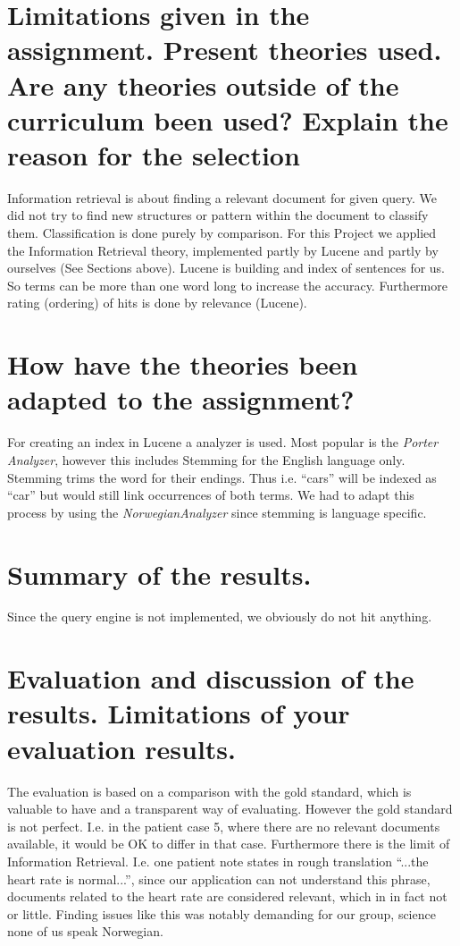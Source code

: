 \documentclass{article}
\begin{document}
\section{Limitations given in the assignment. Present theories used. Are any theories outside of the curriculum been used? Explain the reason for the selection}
Information retrieval is about finding a relevant document for given query. We did not try to find new structures or pattern within the document to classify them. Classification is done purely by comparison. For this Project we applied the Information Retrieval theory, implemented partly by Lucene and partly by ourselves (See Sections above). Lucene is building and index of sentences for us. So terms can be more than one word long to increase the accuracy. Furthermore rating (ordering) of hits is done by relevance (Lucene). 
\section{How have the theories been adapted to the assignment?}
For creating an index in Lucene a analyzer is used. Most popular is the \textit{Porter Analyzer}, however this includes Stemming for the English language only. Stemming trims the word for their endings. Thus i.e. "`cars"' will be indexed as "`car"' but would still link occurrences of both terms. We had to adapt this process by using the \textit{NorwegianAnalyzer} since stemming is language specific. 
\section{Summary of the results.}
Since the query engine is not implemented, we obviously do not hit anything. 
\section{Evaluation and discussion of the results. Limitations of your evaluation results.}
The evaluation is based on a comparison with the gold standard, which is valuable to have and a transparent way of evaluating. However the gold standard is not perfect. I.e. in the patient case 5, where there are no relevant documents available, it would be OK to differ in that case. Furthermore there is the limit of Information Retrieval. I.e. one patient note states in rough translation "`...the heart rate is normal..."', since our application can not understand this phrase, documents related to the heart rate are considered relevant, which in in fact not or little. Finding issues like this was notably demanding for our group, science none of us speak Norwegian. 
\end{document}

